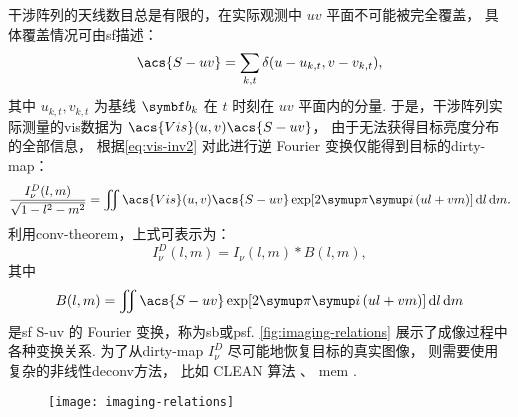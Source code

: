 干涉阵列的天线数目总是有限的，在实际观测中 $uv$ 平面不可能被完全覆盖，
具体覆盖情况可由\ac{sf}描述：
\begin{equation}
  \label{eq:sf}
  \acs{S-uv} = \sum_{k,t} \delta(u - u_{k,t}, v - v_{k,t}),
\end{equation}
其中 $u_{k,t}, v_{k,t}$ 为基线 $\B{b}_k$ 在 $t$ 时刻在 $uv$ 平面内的分量.
于是，干涉阵列实际测量的\acl{vis}数据为 $\acs{Vis}(u,v) \acs{S-uv}$，
由于无法获得目标亮度分布的全部信息，
根据\autoref{eq:vis-inv2} 对此进行逆 Fourier 变换仅能得到目标的\ac{dirty-map}：
\begin{equation}
  \label{eq:dirty-map}
  \frac{I_{\nu}^D(l,m)}{\sqrt{1-l^2-m^2}} = \iint
    \acs{Vis}(u,v) \acs{S-uv} \exp [2\Cpi\Ci\, (ul+vm)] \D{l}\D{m}.
\end{equation}
利用\ac{conv-theorem}，上式可表示为：
\begin{equation}
  I_{\nu}^D(l,m) = I_{\nu}(l,m) * B(l,m),
\end{equation}
其中
\begin{equation}
  \label{eq:syn-beam}
  B(l,m) = \iint \acs{S-uv} \exp [2\Cpi\Ci\, (ul+vm)] \D{l}\D{m}
\end{equation}
是\acl{sf} \acs{S-uv} 的 Fourier 变换，称为\ac{sb}或\ac{psf}.
\autoref{fig:imaging-relations} 展示了成像过程中各种变换关系.
为了从\acl{dirty-map} $I_{\nu}^D$ 尽可能地恢复目标的真实图像，
则需要使用复杂的非线性\ac{deconv}方法，
比如 CLEAN 算法 \cite{hogbom1974,cornwell1999}、
\ac{mem} \cite{narayan1986}.

\begin{figure}
  \centering
  \texttt{[image: imaging-relations]}
  \label{fig:imaging-relations}
\end{figure}

